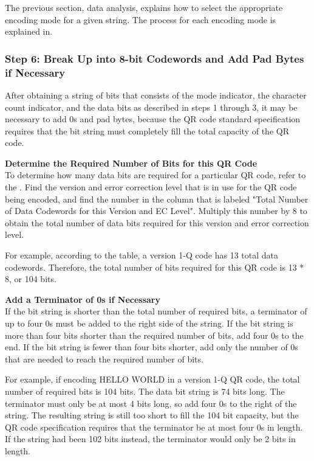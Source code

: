 The previous section, data analysis, explains how to select the appropriate encoding mode for a given string. The process for each encoding mode is explained in\cite{Thonky}.

\subsubsection*{Step 6: Break Up into 8-bit Codewords and Add Pad Bytes if Necessary}


After obtaining a string of bits that consists of the mode indicator, the character count indicator, and the data bits as described in steps 1 through 3, it may be necessary to add 0s and pad bytes, because the QR code standard specification requires that the bit string must completely fill the total capacity of the QR code.

\textbf{Determine the Required Number of Bits for this QR Code}\\
To determine how many data bits are required for a particular QR code, refer to the \cite{1iso}. Find the version and error correction level that is in use for the QR code being encoded, and find the number in the column that is labeled "Total Number of Data Codewords for this Version and EC Level". Multiply this number by 8 to obtain the total number of data bits required for this version and error correction level.

For example, according to the table, a version 1-Q code has 13 total data codewords. Therefore, the total number of bits required for this QR code is 13 * 8, or 104 bits.

\textbf{Add a Terminator of 0s if Necessary}\\
If the bit string is shorter than the total number of required bits, a terminator of up to four 0s must be added to the right side of the string. If the bit string is more than four bits shorter than the required number of bits, add four 0s to the end. If the bit string is fewer than four bits shorter, add only the number of 0s that are needed to reach the required number of bits.

For example, if encoding HELLO WORLD in a version 1-Q QR code, the total number of required bits is 104 bits. The data bit string is 74 bits long. The terminator must only be at most 4 bits long, so add four 0s to the right of the string. The resulting string is still too short to fill the 104 bit capacity, but the QR code specification requires that the terminator be at most four 0s in length. If the string had been 102 bits instead, the terminator would only be 2 bits in length.

